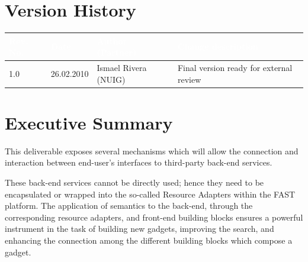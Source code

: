 \documentclass{fast_latex}
\begin{document}


\section*{Version History}

\begin{small}
\begin{tabular}{|l|l|l|p{7.5cm}|}
\hline
\rowcolor{fast@lightgrey}\textcolor{white}{\textbf{Rev. No.}} &
                            \textcolor{white}{\textbf{Date}} &
                            \textcolor{white}{\textbf{Author (Partner)}} &
							\textcolor{white}{\textbf{Change description}}\\ \hline
1.0 & 26.02.2010 & Ismael Rivera (NUIG) & Final version ready for external review \\ \hline
\end{tabular}
\end{small}

\color{black}

\vfill

\newpage


\clearpage

\section*{Executive Summary}
\doublespacing

This deliverable exposes several mechanisms which will allow the connection and interaction between end-user's interfaces to third-party back-end services.

These back-end services cannot be directly used; hence they need to be encapsulated or wrapped into the so-called Resource Adapters within the FAST platform. The application of semantics to the back-end, through the corresponding resource adapters, and front-end building blocks ensures a powerful instrument in the task of building new gadgets, improving the search, and enhancing the connection among the different building blocks which compose a gadget.
\end{document}
